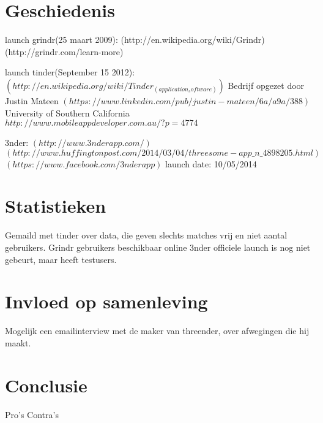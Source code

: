 \documentclass[pdftex,12pt,a4paper]{article}
\begin{document}


\section{Geschiedenis}
launch grindr(25 maart 2009):
(http://en.wikipedia.org/wiki/Grindr)
(http://grindr.com/learn-more)

launch tinder(September 15 2012):
$(http://en.wikipedia.org/wiki/Tinder_(application_software))$
Bedrijf opgezet door Justin Mateen $(https://www.linkedin.com/pub/justin-mateen/6a/a9a/388)$
University of Southern California
$http://www.mobileappdeveloper.com.au/?p=4774$

3nder:
$(http://www.3nderapp.com/)$
$(http://www.huffingtonpost.com/2014/03/04/threesome-app\_n\_4898205.html)$
$(https://www.facebook.com/3nderapp)$
launch date: 10/05/2014
\section{Statistieken}
Gemaild met tinder over data, die geven slechts matches vrij en niet aantal gebruikers.
Grindr gebruikers beschikbaar online
3nder officiele launch is nog niet gebeurt, maar heeft testusers.
\section{Invloed op samenleving}
Mogelijk een emailinterview met de maker van threender, over afwegingen die hij maakt.
\section{Conclusie}
Pro's
Contra's
\end{document}

